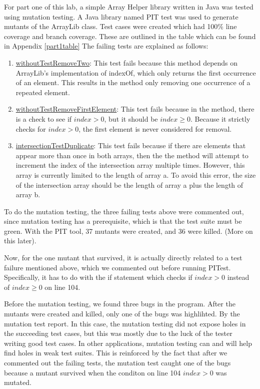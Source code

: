For part one of this lab, a simple Array Helper library written in Java was
tested using mutation testing. A Java library named PIT test was used to 
generate mutants of the ArrayLib class. Test cases were created which had 100\%
line coverage and branch coverage. These are outlined in the table which can be found in Appendix \ref{part1table}
The failing tests are explained as follows:

\begin{enumerate}
\item \underline{withoutTestRemoveTwo}:
        This test fails because this method depends on ArrayLib's implementation
        of indexOf, which only returns the first occurrence of an element. This
        results in the method only removing one occurrence of a repeated
        element.
\item \underline{withoutTestRemoveFirstElement}:
        This test fails because in the method, there is a check to see if
        $index > 0$, but it should be $index \geq 0$. Because it strictly checks
        for $index > 0$, the first element is never considered for removal.
\item \underline{intersectionTestDuplicate}:
        This test fails because if there are elements that appear more than once
        in both arrays, then the the method will attempt to increment the index
        of the intersection array multiple times. However, this array is
        currently limited to the length of array a. To avoid this error, the
        size of the intersection array should be the length of array a plus the
        length of array b. 
\end{enumerate}

To do the mutation testing, the three failing tests above were commented out,
since mutation testing has a prerequisite, which is that the test suite must be
green. With the PIT tool, 37 mutants were created, and 36 were killed. (More on
this later).



Now, for the one mutant that survived, it is actually directly related to a test
failure mentioned above, which we commented out before running PITest.
Specifically, it has to do with the if statement which checks if $index > 0$
instead of $index \geq 0$ on line 104. 


Before the mutation testing, we found three bugs in the program. After the
mutants were created and killed, only one of the bugs was highlihted. By the
mutation test report. In this case, the mutation testing did not expose holes in
the succeeding test cases, but this was mostly due to the luck of the tester
writing good test cases. In other applications, mutation testing can and will
help find holes in weak test suites. This is reinforced by the fact that after
we commented out the failing tests, the mutation test caught one of the bugs
because a mutant survived when the conditon on line 104 $index > 0$ was mutated.

